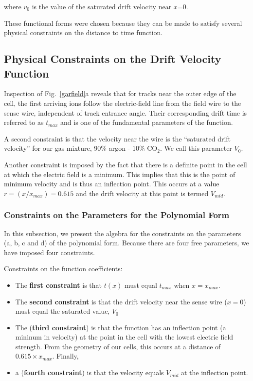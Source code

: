 \documentclass{article}
\begin{document}
\noindent
where $v_0$ is the value of the saturated drift velocity near $x$=0.

These functional forms were chosen because they can be made to satisfy several physical
constraints on the distance to time function.

\subsection{Physical Constraints on the Drift Velocity Function}

Inspection of  Fig.~\ref{garfield}a reveals that for tracks near the outer
edge of the cell, the first arriving ions follow the electric-field line from 
the field wire to the sense wire, independent of track entrance angle.  Their 
corresponding drift time is referred to as $t_{max}$ and is one of the fundamental
parameters of the function. 

A second constraint is that the velocity near the wire is the ``saturated drift
velocity'' for our gas mixture, 90$\%$ argon - 10$\%$ CO$_2$.  We call this parameter $V_0$.

Another constraint is imposed by the fact that there is a definite point in the
cell at which the electric field is a minimum.  This implies that this is the point
of minimum velocity and is thus an inflection point.  This occurs at a value
$r = (x/x_{max}) = 0.615$ and the drift velocity at this point is termed $V_{mid}$.

\subsubsection{Constraints on the Parameters for the Polynomial Form}
In this subsection, we present the algebra for the constraints on the parameters
(a, b, c and d) of the polynomial form.  Because there are four free parameters, we
have imposed four constraints.

Constraints on the function coefficients:
\begin{itemize}
\item The {\bf first constraint} is that $t(x)$ must equal $t_{max}$ when $x = x_{max} $.
\item The {\bf second constraint} is that the drift velocity near the sense wire ($x = 0$)
must equal the saturated value, $V_0$
\item The ({\bf third constraint}) is that the function has an inflection point (a
mininum in velocity) at the point in the cell with the lowest electric field
strength.  From the geometry of our cells, this occurs at a distance
of $ 0.615 \times x_{max}$.  Finally,
\item a ({\bf fourth constraint}) is that the velocity equals $V_{mid}$ at the inflection point.
\end{itemize}
\end{document}
